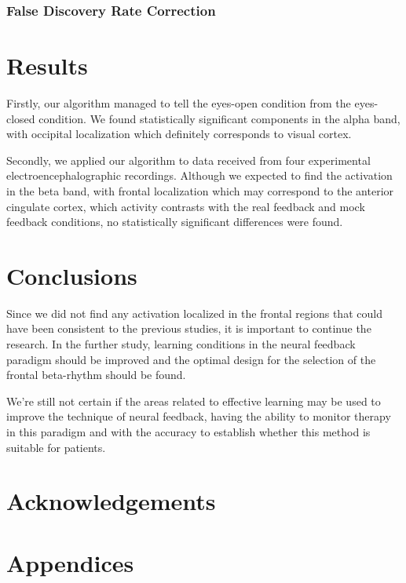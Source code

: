 \documentclass[14pt,a4paper]{scrartcl}
\begin{document}
\subsubsection{False Discovery Rate Correction}
\label{sec:Methods:Data Analysis:False Discovery Rate Correction}

\newpage
\section{Results}
\label{sec:Results}  

Firstly, our algorithm managed to tell the eyes-open condition from the eyes-closed condition. We found statistically significant components in the alpha band, with occipital localization which definitely corresponds to visual cortex.

Secondly, we applied our algorithm to data received from four experimental electroencephalographic recordings. Although we expected to find the activation in the beta band, with frontal localization which may correspond to the anterior cingulate cortex, which activity contrasts with the real feedback and mock feedback conditions, no statistically significant differences were found.

\newpage
\section{Conclusions}
\label{sec:Conclusions} 

Since we did not find any activation localized in the frontal regions that could have been consistent to the previous studies, it is important to continue the research. In the further study, learning conditions in the neural feedback paradigm should be improved and the optimal design for the selection of the frontal beta-rhythm should be found.

We’re still not certain if the areas related to effective learning may be used to improve the technique of neural feedback, having the ability to monitor therapy in this paradigm and with the accuracy to establish whether this method is suitable for patients.

\newpage
\section*{Acknowledgements}
\label{sec:Acknowledgements}

\newpage
\section*{Appendices}
\label{sec:Appendices}

\newpage


\end{document}
